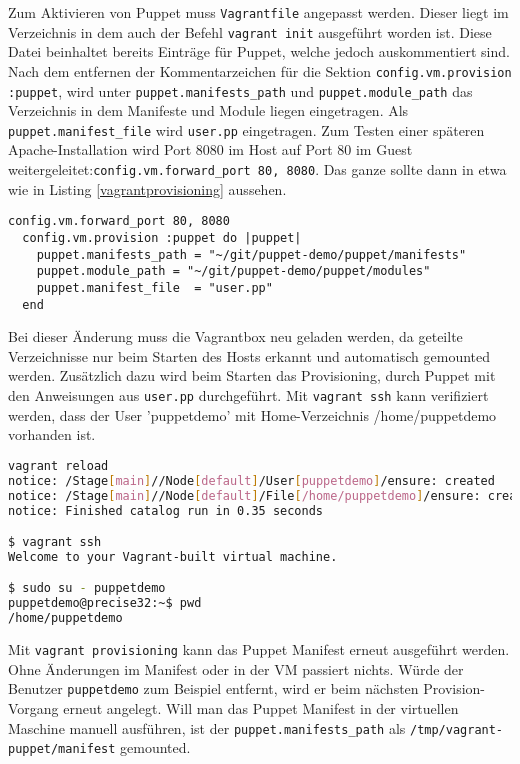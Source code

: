 \documentclass[12pt,a4paper,ngerman]{article}
\begin{document}
 
Zum Aktivieren von Puppet muss \lstinline$Vagrantfile$ angepasst werden. Dieser liegt im Verzeichnis in dem auch der Befehl \lstinline$vagrant init$ ausgeführt worden ist. Diese Datei beinhaltet bereits Einträge für Puppet, welche jedoch auskommentiert sind. Nach dem entfernen der Kommentarzeichen für die Sektion \lstinline$config.vm.provision :puppet$, wird unter \lstinline$puppet.manifests_path$ und \lstinline$puppet.module_path$ das Verzeichnis in dem Manifeste und Module liegen eingetragen. Als \lstinline$puppet.manifest_file$ wird \lstinline$user.pp$ eingetragen. Zum Testen einer späteren Apache-Installation wird Port 8080 im Host auf Port 80 im Guest weitergeleitet:\lstinline$config.vm.forward_port 80, 8080$. Das ganze sollte dann in etwa wie in Listing \ref{vagrantprovisioning} aussehen.
  
\begin{lstlisting}[language=vagrant,caption=Puppet Provisioning in Vagrantfile konfigurieren, label=vagrantprovisioning]
  config.vm.forward_port 80, 8080  
  config.vm.provision :puppet do |puppet|
    puppet.manifests_path = "~/git/puppet-demo/puppet/manifests"
    puppet.module_path = "~/git/puppet-demo/puppet/modules"
    puppet.manifest_file  = "user.pp"
  end
\end{lstlisting} 

Bei dieser Änderung muss die Vagrantbox neu geladen werden, da geteilte Verzeichnisse nur beim Starten des Hosts erkannt und automatisch gemounted werden. Zusätzlich dazu wird beim Starten das Provisioning, durch Puppet mit den Anweisungen aus \lstinline$user.pp$ durchgeführt. Mit \lstinline$vagrant ssh$ kann verifiziert werden, dass der User 'puppetdemo' mit Home-Verzeichnis /home/puppetdemo vorhanden ist.

\begin{lstlisting}[language=sh,caption=Vagrant Box neu laden, label=vagrant-reload]
vagrant reload
notice: /Stage[main]//Node[default]/User[puppetdemo]/ensure: created
notice: /Stage[main]//Node[default]/File[/home/puppetdemo]/ensure: created
notice: Finished catalog run in 0.35 seconds

$ vagrant ssh
Welcome to your Vagrant-built virtual machine.

$ sudo su - puppetdemo
puppetdemo@precise32:~$ pwd
/home/puppetdemo
\end{lstlisting}

Mit \lstinline$vagrant provisioning$ kann das Puppet Manifest erneut ausgeführt werden. Ohne Änderungen im Manifest oder in der VM passiert nichts. Würde der Benutzer \lstinline$puppetdemo$ zum Beispiel entfernt, wird er beim nächsten Provision-Vorgang erneut angelegt.
Will man das Puppet Manifest in der virtuellen Maschine manuell ausführen, ist der \lstinline$puppet.manifests_path$ als \lstinline$/tmp/vagrant-puppet/manifest$ gemounted.
\end{document}
